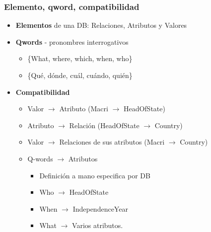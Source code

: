 \fontsize{9.5pt}{7.2}\selectfont
\begin{frame}[<+->]
  \frametitle{Elemento, qword, compatibilidad}
   \begin{itemize}
      \item \textbf{Elementos} de una DB: Relaciones, Atributos y Valores
      \item \textbf{Qwords} - pronombres interrogativos
      \begin{itemize}
          \item \{What, where, which, when, who\}
          \item \{Qué, dónde, cuál, cuándo, quién\}
      \end{itemize}
      \item \textbf{Compatibilidad}
      \begin{itemize}
          \item Valor $\rightarrow$ Atributo (Macri $\rightarrow$ HeadOfState)
          \item Atributo  $\rightarrow$  Relación (HeadOfState $\rightarrow$ Country)
          \item Valor $\rightarrow$ Relaciones de sus atributos (Macri $\rightarrow$ Country)
          \item {\color{blue}Q-words $\rightarrow$ Atributos}
          \begin{itemize}
            \item Definición a mano especifica por DB
            \item Who $\rightarrow$ HeadOfState
            \item When $\rightarrow$ IndependenceYear 
            \item What $\rightarrow$ Varios atributos.
          \end{itemize}
      \end{itemize}
    \end{itemize}
\end{frame}



